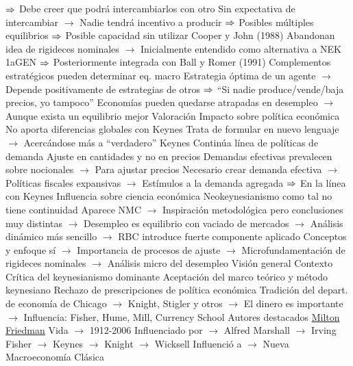 \documentclass{nuevotema}
\begin{document}
\begin{esquemal}
				\4[] $\Rightarrow$ Debe creer que podrá intercambiarlos con otro
				\4 Sin expectativa de intercambiar
				\4[] $\to$ Nadie tendrá incentivo a producir
				\4[] $\Rightarrow$ Posibles múltiples equilibrios
				\4[] $\Rightarrow$ Posible capacidad sin utilizar
				\4 Cooper y John (1988)
				\4[] Abandonan idea de rigideces nominales
				\4[] $\to$ Inicialmente entendido como alternativa a NEK 1aGEN
				\4[] $\Rightarrow$ Posteriormente integrada con Ball y Romer (1991)
				\4[] Complementos estratégicos pueden determinar eq. macro
				\4[] Estrategia óptima de un agente
				\4[] $\to$ Depende positivamente de estrategias de otros
				\4[] $\Rightarrow$ ``Si nadie produce/vende/baja precios, yo tampoco''
				\4[] Economías pueden quedarse atrapadas en desempleo
				\4[] $\to$ Aunque exista un equilibrio mejor
		\2 Valoración
			\3 Impacto sobre política económica
				\4 No aporta diferencias globales con Keynes
				\4[] Trata de formular en nuevo lenguaje
				\4[] $\to$ Acercándose más a ``verdadero'' Keynes
				\4 Continúa línea de políticas de demanda
				\4[] Ajuste en cantidades y no en precios
				\4[] Demandas efectivas prevalecen sobre nocionales
				\4[] $\to$ Para ajustar precios
				\4[] Necesario crear demanda efectiva
				\4[] $\to$ Políticas fiscales expansivas
				\4[] $\to$ Estímulos a la demanda agregada
				\4[] $\Rightarrow$ En la línea con Keynes
			\3 Influencia sobre ciencia económica
				\4 Neokeynesianismo como tal no tiene continuidad
				\4[] Aparece NMC
				\4[] $\to$ Inspiración metodológica pero conclusiones muy distintas
				\4[] $\to$ Desempleo es equilibrio con vaciado de mercados
				\4[] $\to$ Análisis dinámico más sencillo
				\4[] $\to$ RBC introduce fuerte componente aplicado
				\4 Conceptos y enfoque sí
				\4[] $\to$ Importancia de procesos de ajuste
				\4[] $\to$ Microfundamentación de rigideces nominales
				\4[] $\to$ Análisis micro del desempleo
	\1 
		\2 Visión general
			\3 Contexto
				\4 Crítica del keynesianismo dominante
				\4[] Aceptación del marco teórico y método keynesiano
				\4[] Rechazo de prescripciones de política económica
				\4[] Tradición del depart. de economía de Chicago
				\4[] $\to$ Knight, Stigler y otros
				\4[] $\to$ El dinero es importante
				\4[] $\to$ Influencia: Fisher, Hume, Mill, Currency School
				\4 Autores destacados
				\4[] \underline{Milton Friedman}
				\4[] Vida
				\4[] $\to$ 1912-2006
				\4[] Influenciado por
				\4[] $\to$ Alfred Marshall
				\4[] $\to$ Irving Fisher
				\4[] $\to$ Keynes
				\4[] $\to$ Knight
				\4[] $\to$ Wicksell
				\4[] Influenció a
				\4[] $\to$ Nueva Macroeconomía Clásica

\end{esquemal}
\end{document}
